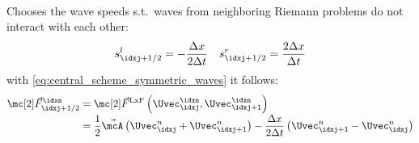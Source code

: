 \begin{defnbox}\nospacing
    \begin{defn}\label{defn:lax_friedrichs_scheme_system}\leavevmode\\
        Chooses the wave speeds s.t.\ waves from neighboring Riemann problems do not interact with each other:
        \begin{align}
          s_{\idxj+1/2}^{l}=-\frac{\Delta x}{2\Delta t}&&s_{\idxj+1/2}^{r}=\frac{2\Delta x}{\Delta t}
        \end{align}
        with \cref{eq:central_scheme_symmetric_waves} it follows:
        \begin{align}
          \Fluxvec_{\idxj+1/2}^{\idxn}&=\Fluxvec^{\text{LxF}}\left(\Uvec^{\idxn}_{\idxj},\Uvec^{\idxn}_{\idxj+1}\right)\\[-1\jot]
          &=\frac{1}{2}\linfluxvec \left(\Uvec_{\idxj}^{n}+\Uvec_{\idxj+1}^{n}\right)-\frac{\Delta x}{2\Delta t}\left(\Uvec_{\idxj+1}^{n}-\Uvec_{\idxj}^{n}\right)\nonumber
        \end{align}
    \end{defn}
\end{defnbox}
